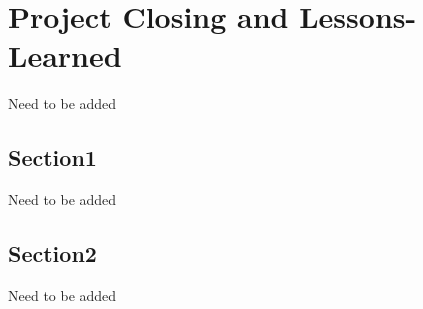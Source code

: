 \chapter{Project Closing and Lessons-Learned}
Need to be added
\section{Section1}
Need to be added
\section{Section2}
Need to be added